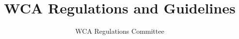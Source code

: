 
\usepackage[top=2cm, bottom=2cm, left=2cm, right=2cm]{geometry}

\usepackage[bookmarksopen=true]{hyperref}

\usepackage{bookmark}

\usepackage{fancyhdr}
\pagestyle{fancy}

\setcounter{secnumdepth}{-1}

\title{WCA Regulations and Guidelines}
\author{WCA Regulations Committee}
\date{\vspace{-1em}}



\maketitle
